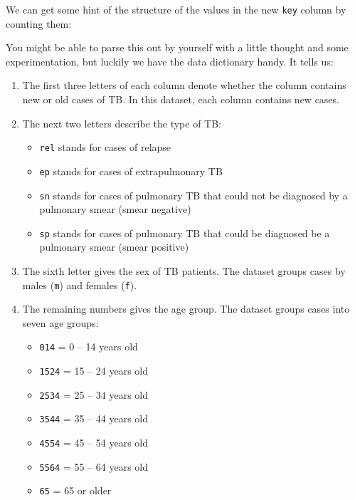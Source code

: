 \documentclass[]{book}
\newenvironment{Shaded}{\begin{snugshade}}{\end{snugshade}}
\newcommand{\KeywordTok}[1]{\textcolor[rgb]{0.13,0.29,0.53}{\textbf{{#1}}}}
\newcommand{\StringTok}[1]{\textcolor[rgb]{0.31,0.60,0.02}{{#1}}}
\newcommand{\CommentTok}[1]{\textcolor[rgb]{0.56,0.35,0.01}{\textit{{#1}}}}
\newcommand{\NormalTok}[1]{{#1}}
\providecommand{\tightlist}{%
  \setlength{\itemsep}{0pt}\setlength{\parskip}{0pt}}
\begin{document}
We can get some hint of the structure of the values in the new
\texttt{key} column by counting them:

\begin{Shaded}
\end{Shaded}

You might be able to parse this out by yourself with a little thought
and some experimentation, but luckily we have the data dictionary handy.
It tells us:

\begin{enumerate}
\def\labelenumi{\arabic{enumi}.}
\item
  The first three letters of each column denote whether the column
  contains new or old cases of TB. In this dataset, each column contains
  new cases.
\item
  The next two letters describe the type of TB:

  \begin{itemize}
  \tightlist
  \item
    \texttt{rel} stands for cases of relapse
  \item
    \texttt{ep} stands for cases of extrapulmonary TB
  \item
    \texttt{sn} stands for cases of pulmonary TB that could not be
    diagnosed by a pulmonary smear (smear negative)
  \item
    \texttt{sp} stands for cases of pulmonary TB that could be diagnosed
    be a pulmonary smear (smear positive)
  \end{itemize}
\item
  The sixth letter gives the sex of TB patients. The dataset groups
  cases by males (\texttt{m}) and females (\texttt{f}).
\item
  The remaining numbers gives the age group. The dataset groups cases
  into seven age groups:

  \begin{itemize}
  \tightlist
  \item
    \texttt{014} = 0 -- 14 years old
  \item
    \texttt{1524} = 15 -- 24 years old
  \item
    \texttt{2534} = 25 -- 34 years old
  \item
    \texttt{3544} = 35 -- 44 years old
  \item
    \texttt{4554} = 45 -- 54 years old
  \item
    \texttt{5564} = 55 -- 64 years old
  \item
    \texttt{65} = 65 or older
  \end{itemize}
\end{enumerate}
\end{document}
